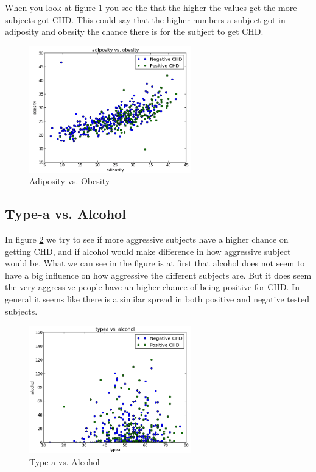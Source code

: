 When you look at figure \ref{ObeAsi} you see the that the higher the values get the more subjects got CHD. This could say that the higher numbers a subject got in adiposity and obesity the chance there is for the subject to get CHD.

\begin{figure}[H]
\centering
\includegraphics[width=7cm, keepaspectratio=true]{pictures/adiposityObesity.png}
\vspace{-0.4cm}
\caption{\footnotesize Adiposity vs. Obesity}
\label{ObeAsi}
\end{figure}

\subsection{Type-a vs. Alcohol}

In figure \ref{typeAlco} we try to see if more aggressive subjects have a higher chance on getting CHD, and if alcohol would make difference in how aggressive subject would be. What we can see in the figure is at first that alcohol does not seem to have a big influence on how aggressive the different subjects are. But it does seem the very aggressive people have an higher chance of being positive for CHD. In general it seems like there is a similar spread in both positive and negative tested subjects.

\begin{figure}[H]
\centering
\includegraphics[width=7cm, keepaspectratio=true]{pictures/typeaalcohol.png}
\vspace{-0.4cm}
\caption{\footnotesize Type-a vs. Alcohol}
\label{typeAlco}
\end{figure}